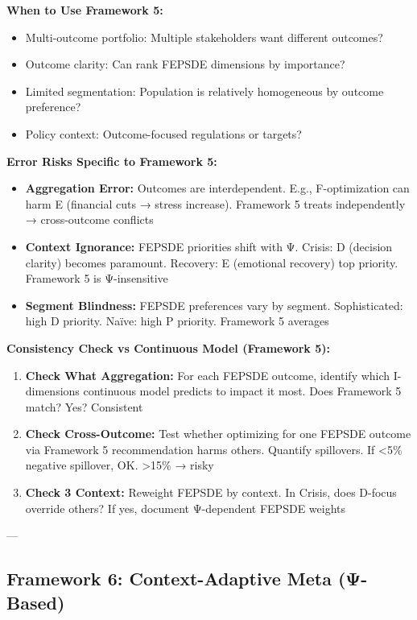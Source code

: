 \textbf{When to Use Framework 5:}
\begin{itemize}[nosep]
\item Multi-outcome portfolio: Multiple stakeholders want different outcomes?
\item Outcome clarity: Can rank FEPSDE dimensions by importance?
\item Limited segmentation: Population is relatively homogeneous by outcome preference?
\item Policy context: Outcome-focused regulations or targets?
\end{itemize}

\textbf{Error Risks Specific to Framework 5:}
\begin{itemize}[nosep]
\item \textbf{Aggregation Error:} Outcomes are interdependent. E.g., F-optimization can harm E (financial cuts → stress increase). Framework 5 treats independently → cross-outcome conflicts
\item \textbf{Context Ignorance:} FEPSDE priorities shift with Ψ. Crisis: D (decision clarity) becomes paramount. Recovery: E (emotional recovery) top priority. Framework 5 is Ψ-insensitive
\item \textbf{Segment Blindness:} FEPSDE preferences vary by segment. Sophisticated: high D priority. Naïve: high P priority. Framework 5 averages
\end{itemize}

\textbf{Consistency Check vs Continuous Model (Framework 5):}
\begin{enumerate}[nosep]
\item \textbf{Check What Aggregation:} For each FEPSDE outcome, identify which I-dimensions continuous model predicts to impact it most. Does Framework 5 match? Yes? Consistent
\item \textbf{Check Cross-Outcome:} Test whether optimizing for one FEPSDE outcome via Framework 5 recommendation harms others. Quantify spillovers. If <5\% negative spillover, OK. >15\% → risky
\item \textbf{Check 3 Context:} Reweight FEPSDE by context. In Crisis, does D-focus override others? If yes, document Ψ-dependent FEPSDE weights
\end{enumerate}

---

\subsection{Framework 6: Context-Adaptive Meta (Ψ-Based)}
\label{subsec:20-framework-6}

